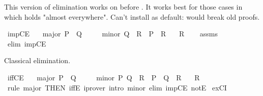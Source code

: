 \begin{isabellebody}
{\isafoldproof}%
%
\isadelimproof
%
\endisadelimproof
%
\begin{isamarkuptext}%
This version of \isa{{\isasymlongrightarrow}} elimination works on  before .  It works best for
  those cases in which  holds "almost everywhere".  Can't install as
  default: would break old proofs.%
\end{isamarkuptext}\isamarkuptrue%
\isamarkupfalse%
\ impCE{\isacharprime}{\kern0pt}{\isacharcolon}{\kern0pt}\isanewline
\ \ \ major{\isacharcolon}{\kern0pt}\ {\isachardoublequoteopen}P\ {\isasymlongrightarrow}\ Q{\isachardoublequoteclose}\isanewline
\ \ \ \ \ minor{\isacharcolon}{\kern0pt}\ {\isachardoublequoteopen}Q\ {\isasymLongrightarrow}\ R{\isachardoublequoteclose}\ {\isachardoublequoteopen}{\isasymnot}\ P\ {\isasymLongrightarrow}\ R{\isachardoublequoteclose}\isanewline
\ \ \ R\isanewline
%
\isadelimproof
\ \ %
\endisadelimproof
%
\isatagproof
{}\isamarkupfalse%
\ assms\ \isamarkupfalse%
\ {\isacharparenleft}{\kern0pt}elim\ impCE{\isacharparenright}{\kern0pt}%
\endisatagproof
{\isafoldproof}%
%
\isadelimproof
%
\endisadelimproof
%
\begin{isamarkuptext}%
Classical \isa{{\isasymlongleftrightarrow}} elimination.%
\end{isamarkuptext}\isamarkuptrue%
\isamarkupfalse%
\ iffCE{\isacharcolon}{\kern0pt}\isanewline
\ \ \ major{\isacharcolon}{\kern0pt}\ {\isachardoublequoteopen}P\ {\isacharequal}{\kern0pt}\ Q{\isachardoublequoteclose}\isanewline
\ \ \ \ \ minor{\isacharcolon}{\kern0pt}\ {\isachardoublequoteopen}{\isasymlbrakk}P{\isacharsemicolon}{\kern0pt}\ Q{\isasymrbrakk}\ {\isasymLongrightarrow}\ R{\isachardoublequoteclose}\ {\isachardoublequoteopen}{\isasymlbrakk}{\isasymnot}\ P{\isacharsemicolon}{\kern0pt}\ {\isasymnot}\ Q{\isasymrbrakk}\ {\isasymLongrightarrow}\ R{\isachardoublequoteclose}\isanewline
\ \ \ R\isanewline
%
\isadelimproof
\ \ %
\endisadelimproof
%
\isatagproof
{}\isamarkupfalse%
\ {\isacharparenleft}{\kern0pt}rule\ major\ {\isacharbrackleft}{\kern0pt}THEN\ iffE{\isacharbrackright}{\kern0pt}{\isacharparenright}{\kern0pt}\ {\isacharparenleft}{\kern0pt}iprover\ intro{\isacharcolon}{\kern0pt}\ minor\ elim{\isacharcolon}{\kern0pt}\ impCE\ notE{\isacharparenright}{\kern0pt}%
\endisatagproof
{\isafoldproof}%
%
\isadelimproof
\isanewline
%
\endisadelimproof
\isanewline
{}\isamarkupfalse%
\ exCI{\isacharcolon}{\kern0pt}\isanewline

\end{isabellebody}
